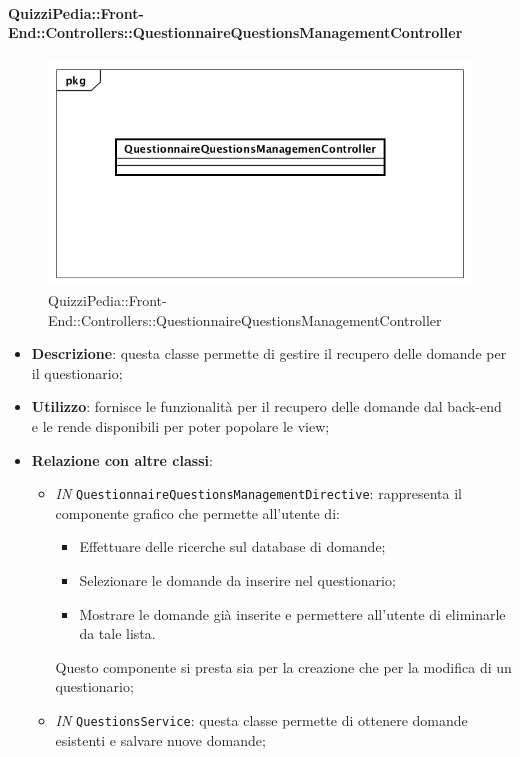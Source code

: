 \begin{itemize}
\paragraph{QuizziPedia::Front-End::Controllers::QuestionnaireQuestionsManagementController}
\begin{figure} [ht]
	\centering
	\includegraphics[scale=0.45]{UML/Classi/Front-End/QuizziPedia_Front-end_Controller_QuestionnaireQuestionsManagementController.png}
	\caption{QuizziPedia::Front-End::Controllers::QuestionnaireQuestionsManagementController}
\end{figure} \FloatBarrier
\begin{itemize}
	\item \textbf{Descrizione}: questa classe permette di gestire il recupero delle domande per il questionario;
	\item \textbf{Utilizzo}: fornisce le funzionalità per il recupero delle domande dal back-end e le rende disponibili per poter popolare le view;
	\item \textbf{Relazione con altre classi}:
	\begin{itemize}
		\item \textit{IN} \texttt{QuestionnaireQuestionsManagementDirective}: rappresenta il componente grafico che permette all'utente di:
		\begin{itemize}
			\item Effettuare delle ricerche sul database di domande;
			\item Selezionare le domande da inserire nel questionario;
			\item Mostrare le domande già inserite e permettere all'utente di eliminarle da tale lista.
		\end{itemize}
		Questo componente si presta sia per la creazione che per la modifica di un questionario;
		\item \textit{IN} \texttt{QuestionsService}: questa classe permette di ottenere domande esistenti e salvare nuove domande;

\end{itemize}
\end{itemize}
\end{itemize}
